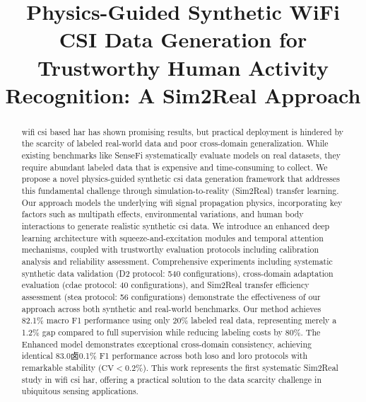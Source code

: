 \documentclass[journal]{IEEEtran}
\begin{document}
\title{Physics-Guided Synthetic WiFi CSI Data Generation for Trustworthy Human Activity Recognition: A Sim2Real Approach}

\author{
}

\maketitle

\begin{abstract}
\gls{wifi} \gls{csi} based \gls{har} has shown promising results, but practical deployment is hindered by the scarcity of labeled real-world data and poor cross-domain generalization. While existing benchmarks like SenseFi systematically evaluate models on real datasets, they require abundant labeled data that is expensive and time-consuming to collect. We propose a novel physics-guided synthetic \gls{csi} data generation framework that addresses this fundamental challenge through simulation-to-reality (Sim2Real) transfer learning. Our approach models the underlying \gls{wifi} signal propagation physics, incorporating key factors such as multipath effects, environmental variations, and human body interactions to generate realistic synthetic \gls{csi} data. We introduce an enhanced deep learning architecture with squeeze-and-excitation modules and temporal attention mechanisms, coupled with trustworthy evaluation protocols including calibration analysis and reliability assessment. Comprehensive experiments including systematic synthetic data validation (D2 protocol: 540 configurations), cross-domain adaptation evaluation (\gls{cdae} protocol: 40 configurations), and Sim2Real transfer efficiency assessment (\gls{stea} protocol: 56 configurations) demonstrate the effectiveness of our approach across both synthetic and real-world benchmarks. Our method achieves 82.1\% macro F1 performance using only 20\% labeled real data, representing merely a 1.2\% gap compared to full supervision while reducing labeling costs by 80\%. The Enhanced model demonstrates exceptional cross-domain consistency, achieving identical 83.0卤0.1\% F1 performance across both \gls{loso} and \gls{loro} protocols with remarkable stability ($\text{CV}<0.2\%$). This work represents the first systematic Sim2Real study in \gls{wifi} \gls{csi} \gls{har}, offering a practical solution to the data scarcity challenge in ubiquitous sensing applications.
\end{abstract}
\end{document}
